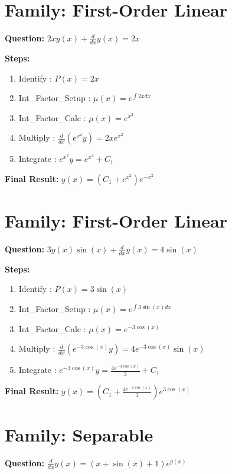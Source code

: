 \documentclass{article}
\begin{document}
\section*{Family: First-Order Linear}
\textbf{Question:} $2 x y{\left(x \right)} + \frac{d}{d x} y{\left(x \right)} = 2 x$

\textbf{Steps:}
\begin{enumerate}
\item Identify :  $P(x) = 2 x$
\item Int_Factor_Setup :  $\mu(x) = e^{\int 2 x dx}$
\item Int_Factor_Calc :  $\mu(x) = e^{x^{2}}$
\item Multiply :  $\frac{d}{dx}(e^{x^{2}}y) = 2 x e^{x^{2}}$
\item Integrate :  $e^{x^{2}}y = e^{x^{2}} + C_1$
\end{enumerate}
\textbf{Final Result:} $y{\left(x \right)} = \left(C_{1} + e^{x^{2}}\right) e^{- x^{2}}$

\section*{Family: First-Order Linear}
\textbf{Question:} $3 y{\left(x \right)} \sin{\left(x \right)} + \frac{d}{d x} y{\left(x \right)} = 4 \sin{\left(x \right)}$

\textbf{Steps:}
\begin{enumerate}
\item Identify :  $P(x) = 3 \sin{\left(x \right)}$
\item Int_Factor_Setup :  $\mu(x) = e^{\int 3 \sin{\left(x \right)} dx}$
\item Int_Factor_Calc :  $\mu(x) = e^{- 3 \cos{\left(x \right)}}$
\item Multiply :  $\frac{d}{dx}(e^{- 3 \cos{\left(x \right)}}y) = 4 e^{- 3 \cos{\left(x \right)}} \sin{\left(x \right)}$
\item Integrate :  $e^{- 3 \cos{\left(x \right)}}y = \frac{4 e^{- 3 \cos{\left(x \right)}}}{3} + C_1$
\end{enumerate}
\textbf{Final Result:} $y{\left(x \right)} = \left(C_{1} + \frac{4 e^{- 3 \cos{\left(x \right)}}}{3}\right) e^{3 \cos{\left(x \right)}}$

\section*{Family: Separable}
\textbf{Question:} $\frac{d}{d x} y{\left(x \right)} = \left(x + \sin{\left(x \right)} + 1\right) e^{y{\left(x \right)}}$
\end{document}
